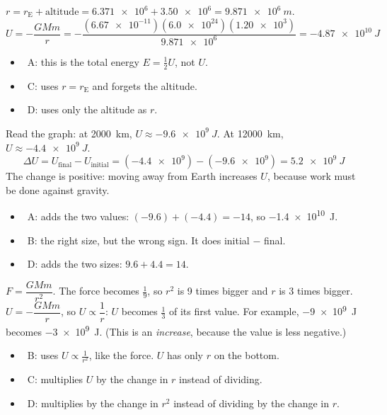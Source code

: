 \begin{practiceanswers}
\begin{practiceans}
  $r = r_\mathrm{E} + \text{altitude} = \num{6.371e6} + \num{3.50e6} = \qty{9.871e6}{m}$.
  \[ U = -\frac{GMm}{r} = -\frac{(\num{6.67e-11})(\num{6.0e24})(\num{1.20e3})}{\num{9.871e6}}
       = \qty{-4.87e10}{J} \]
  \begin{itemize}
    \item \xmark\ A: this is the total energy $E = \frac{1}{2}U$, not $U$.
    \item \xmark\ C: uses $r = r_\mathrm{E}$ and forgets the altitude.
    \item \xmark\ D: uses only the altitude as $r$.
  \end{itemize}
\end{practiceans}

\begin{practiceans}
  Read the graph: at \qty{2000}{km}, $U \approx \qty{-9.6e9}{J}$. At \qty{12000}{km},
  $U \approx \qty{-4.4e9}{J}$.
  \[ \Delta U = U_\mathrm{final} - U_\mathrm{initial} = (\num{-4.4e9}) - (\num{-9.6e9})
     = \qty[retain-explicit-plus]{+5.2e9}{J} \]
  The change is positive: moving away from Earth increases $U$, because work must be done against
  gravity.
  \begin{itemize}
    \item \xmark\ A: adds the two values: $(-9.6) + (-4.4) = -14$, so \qty{-1.4e10}{J}.
    \item \xmark\ B: the right size, but the wrong sign. It does initial $-$ final.
    \item \xmark\ D: adds the two sizes: $9.6 + 4.4 = 14$.
  \end{itemize}
\end{practiceans}

\begin{practiceans}
  $F = \dfrac{GMm}{r^2}$. The force becomes $\frac{1}{9}$, so $r^2$ is 9 times bigger and $r$ is
  3 times bigger. $U = -\dfrac{GMm}{r}$, so $U \propto \dfrac{1}{r}$: $U$ becomes $\frac{1}{3}$ of
  its first value. For example, \qty{-9e9}{J} becomes \qty{-3e9}{J}. (This is an
  \emph{increase}, because the value is less negative.)
  \begin{itemize}
    \item \xmark\ B: uses $U \propto \frac{1}{r^2}$, like the force. $U$ has only $r$ on the bottom.
    \item \xmark\ C: multiplies $U$ by the change in $r$ instead of dividing.
    \item \xmark\ D: multiplies by the change in $r^2$ instead of dividing by the change in $r$.
  \end{itemize}
\end{practiceans}


\end{practiceanswers}
